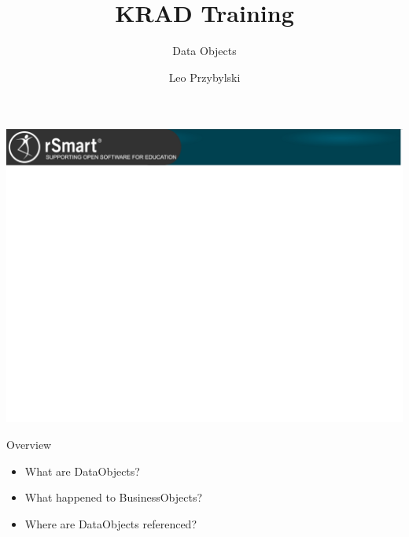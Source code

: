 \documentclass[xcolor=dvipsnames,14pt,professionalfonts]{beamer}
\begin{document}
\title{KRAD Training}
\subtitle{Data Objects}
\author[Leo]{Leo Przybylski}

\usebackgroundtemplate%
{%
    \includegraphics[width=\paperwidth,height=\paperheight]{../img/header.png}%
}

{
%
\begin{frame}[plain]
  \titlepage
\end{frame}
}

\begin{frame}{Overview}
  \begin{itemize}
    \item What are DataObjects?
    \item What happened to BusinessObjects?
    \item Where are DataObjects referenced?
  \end{itemize}
\end{frame}
\end{document}

